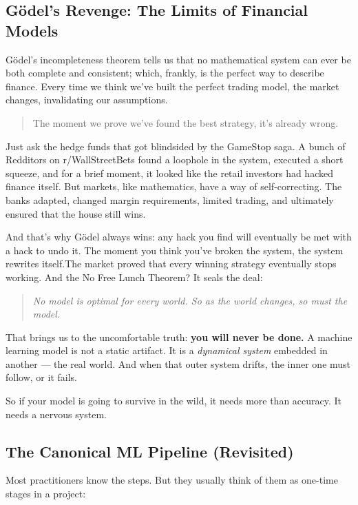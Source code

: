 \subsection{Gödel’s Revenge: The Limits of Financial Models}

Gödel’s incompleteness theorem tells us that no mathematical system can ever be both complete and consistent; which, frankly, is the perfect way to describe finance. Every time we think we’ve built the perfect trading model, the market changes, invalidating our assumptions.  

\begin{quote}
The moment we prove we’ve found the best strategy, it’s already wrong.
\end{quote}  

Just ask the hedge funds that got blindsided by the GameStop saga. A bunch of Redditors on r/WallStreetBets found a loophole in the system, executed a short squeeze, and for a brief moment, it looked like the retail investors had hacked finance itself. But markets, like mathematics, have a way of self-correcting. The banks adapted, changed margin requirements, limited trading, and ultimately ensured that the house still wins.  

And that’s why Gödel always wins: any hack you find will eventually be met with a hack to undo it. The moment you think you’ve broken the system, the system rewrites itself.The market proved that every winning strategy eventually stops working. And the No Free Lunch Theorem? It seals the deal:

\begin{quote}
\textit{No model is optimal for every world. So as the world changes, so must the model.}
\end{quote}

That brings us to the uncomfortable truth: \textbf{you will never be done.} A machine learning model is not a static artifact. It is a \textit{dynamical system} embedded in another — the real world. And when that outer system drifts, the inner one must follow, or it fails.

So if your model is going to survive in the wild, it needs more than accuracy. It needs a nervous system.

\subsection{The Canonical ML Pipeline (Revisited)}

Most practitioners know the steps. But they usually think of them as one-time stages in a project:

